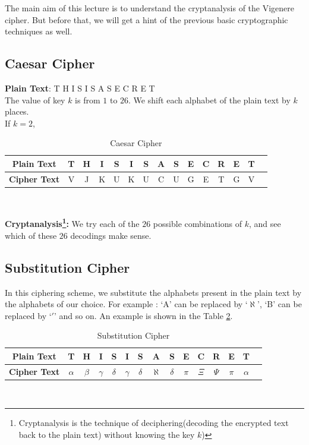 \documentclass[a4paper]{article}
\begin{document}
The main aim of this lecture is to understand the cryptanalysis of the Vigenere cipher. But before that, we will get a hint of the previous basic cryptographic techniques as well. 

\subsection{Caesar Cipher}
\textbf{Plain Text}:\hspace{1mm} T H I S I S A S E C R E T\\

The value of key $k$ is from $1$ to $26$. We shift each alphabet of the plain text by $k$ places. \\
If $k=2$,

\begin{table}[h]
\begin{center}
\begin{tabular}{ |c|c|c|c|c|c|c|c|c|c|c|c|c|c|c| }
\hline
\textbf{Plain Text} & T & H & I & S & I & S & A & S & E & C & R & E & T \\
\hline
\textbf{Cipher Text} & V & J & K & U & K & U & C & U & G & E & T & G & V \\
\hline
\end{tabular}\\
\vspace{2mm}
\caption{Caesar Cipher}
\label{caesar}
\end{center}
\end{table}



\textbf{Cryptanalysis\footnote{Cryptanalysis is the technique of deciphering(decoding the encrypted text back to the plain text) without knowing the key $k$)}:}
We try each of the $26$ possible combinations of $k$, and see which of these $26$ decodings make sense. 

\subsection{Substitution Cipher}
In this ciphering scheme, we substitute the alphabets present in the plain text by the alphabets of our choice. For example : `A' can be replaced by `$\aleph$', `B' can be replaced by `$\prime$' and so on. 
An example is shown in the Table \ref{sub}.

\begin{table}[h]
\begin{center}
\begin{tabular}{ |c|c|c|c|c|c|c|c|c|c|c|c|c|c|c| }
\hline
\textbf{Plain Text} & T & H & I & S & I & S & A & S & E & C & R & E & T \\
\hline
\textbf{Cipher Text} & $\alpha$ & $\beta$ & $\gamma$ & $\delta$ & $\gamma$ & $\delta$ & $\aleph$ & $\delta$ & $\pi$ & $\Xi$ & $\Psi$ & $\pi$ & $\alpha$ \\
\hline
\end{tabular}\\
\vspace{2mm}
\caption{Substitution Cipher}
\label{sub}
\end{center}
\end{table}
\end{document}
